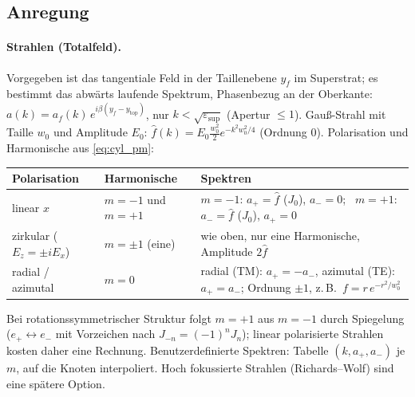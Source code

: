 \subsection{Anregung}\label{sec:cylexc}
\paragraph{Strahlen (Totalfeld).} Vorgegeben ist das tangentiale Feld in der Taillenebene $y_f$ im Superstrat; es bestimmt
das abwärts laufende Spektrum, Phasenbezug an der Oberkante: $a(k)=a_f(k)\,e^{i\beta(y_f-y_{\text{top}})}$, nur
$k<\sqrt{\varepsilon_{\text{sup}}}$ (Apertur $\le1$). Gauß-Strahl mit Taille $w_0$ und Amplitude $E_0$:
$\hat f(k)=E_0\tfrac{w_0^2}2e^{-k^2w_0^2/4}$ (Ordnung 0). Polarisation und Harmonische aus \eqref{eq:cyl_pm}:
\begin{center}
\small
\begin{tabular}{p{2.8cm}p{2.6cm}p{9.6cm}}
\toprule
Polarisation & Harmonische & Spektren \\
\midrule
linear $x$ & $m=-1$ und $m=+1$ & $m=-1$: $a_+=\hat f$ ($J_0$), $a_-=0$; \ $m=+1$: $a_-=\hat f$ ($J_0$), $a_+=0$ \\
zirkular ($E_z=\pm iE_x$) & $m=\pm1$ (eine) & wie oben, nur eine Harmonische, Amplitude $2\hat f$ \\
radial / azimutal & $m=0$ & radial (TM): $a_+=-a_-$, azimutal (TE): $a_+=a_-$; Ordnung $\pm1$, z.\,B.\ $f=r\,e^{-r^2/w_0^2}$ \\
\bottomrule
\end{tabular}
\end{center}
Bei rotationssymmetrischer Struktur folgt $m=+1$ aus $m=-1$ durch Spiegelung ($e_+\leftrightarrow e_-$ mit Vorzeichen nach
$J_{-n}=(-1)^nJ_n$); linear polarisierte Strahlen kosten daher eine Rechnung. Benutzerdefinierte Spektren: Tabelle
$(k,a_+,a_-)$ je $m$, auf die Knoten interpoliert. Hoch fokussierte Strahlen (Richards--Wolf) sind eine spätere Option.

